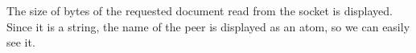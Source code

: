 \documentclass{ozdoc}
\begin{document}
The size of bytes of the requested document  read from the socket is displayed. Since it is a string, the name of the peer  is displayed as an atom, so we can easily see it.  \mozartEMPTY
 \mozartEMPTY
 


 \mozartEMPTY
\begin{mozartCODEDISPLAY}\mozartFACETEXT{\mozartNEWLINE
}\mozartFACETEXT{\mozartSPACE{}}\mozartFACETEXT{\mozartSPACE{}\mozartSPACE{}\mozartSPACE{}\mozartNEWLINE
}
\end{mozartCODEDISPLAY}
\end{document}
